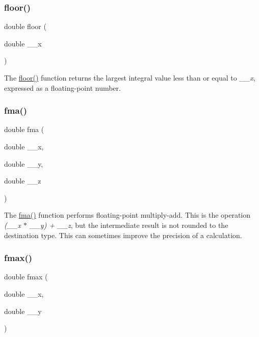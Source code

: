 \subsubsection{\texorpdfstring{floor()}{floor()}}
{\footnotesize\ttfamily double floor (\begin{DoxyParamCaption}\item[{double}]{\+\_\+\+\_\+x }\end{DoxyParamCaption})}

The \hyperlink{group__avr__math_ga4fdf30fdaae0cbccc44343184457464d}{floor()} function returns the largest integral value less than or equal to {\itshape \+\_\+\+\_\+x}, expressed as a floating-\/point number. \mbox{\label{group__avr__math_ga82029dbf001eaea490ba44d439cbd660}} 
\subsubsection{\texorpdfstring{fma()}{fma()}}
{\footnotesize\ttfamily double fma (\begin{DoxyParamCaption}\item[{double}]{\+\_\+\+\_\+x,  }\item[{double}]{\+\_\+\+\_\+y,  }\item[{double}]{\+\_\+\+\_\+z }\end{DoxyParamCaption})}

The \hyperlink{group__avr__math_ga82029dbf001eaea490ba44d439cbd660}{fma()} function performs floating-\/point multiply-\/add. This is the operation {\itshape (\+\_\+\+\_\+x $\ast$ \+\_\+\+\_\+y) + \+\_\+\+\_\+z}, but the intermediate result is not rounded to the destination type. This can sometimes improve the precision of a calculation. \mbox{\label{group__avr__math_ga826d43c13b1800b7c906bd35e31ee15f}} 
\subsubsection{\texorpdfstring{fmax()}{fmax()}}
{\footnotesize\ttfamily double fmax (\begin{DoxyParamCaption}\item[{double}]{\+\_\+\+\_\+x,  }\item[{double}]{\+\_\+\+\_\+y }\end{DoxyParamCaption})}

